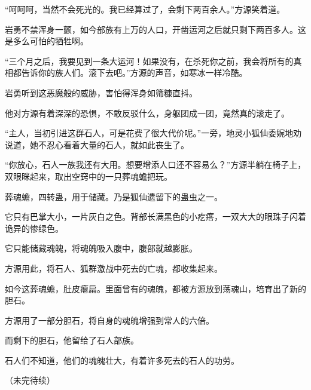 \begin{this_body}
“呵呵呵，当然不会死光的。我已经算过了，会剩下两百余人。”方源笑着道。

岩勇不禁浑身一颤，如今部族有上万的人口，开凿运河之后就只剩下两百多人。这是多么可怕的牺牲啊。

“三个月之后，我要见到一条大运河！如果没有，在杀死你之前，我会将所有的真相都告诉你的族人们。滚下去吧。”方源的声音，如寒冰一样冷酷。

岩勇听到这恶魔般的威胁，害怕得浑身如筛糠直抖。

他对方源有着深深的恐惧，不敢反驳什么，身躯团成一团，竟然真的滚走了。

“主人，当初引进这群石人，可是花费了很大代价呢。”一旁，地灵小狐仙委婉地劝说道，她不忍心看着大量的石人，就如此丧生了。

“你放心，石人一族我还有大用。想要增添人口还不容易么？”方源半躺在椅子上，双眼眯起来，取出空窍中的一只葬魂蟾把玩。

葬魂蟾，四转蛊，用于储藏。乃是狐仙遗留下的蛊虫之一。

它只有巴掌大小，一片灰白之色。背部长满黑色的小疙瘩，一双大大的眼珠子闪着诡异的惨绿色。

它只能储藏魂魄，将魂魄吸入腹中，腹部就越膨胀。

方源用此，将石人、狐群激战中死去的亡魂，都收集起来。

如今这葬魂蟾，肚皮瘪扁。里面曾有的魂魄，都被方源放到荡魂山，培育出了新的胆石。

方源用了一部分胆石，将自身的魂魄增强到常人的六倍。

而剩下的胆石，他留给了石人部族。

石人们不知道，他们的魂魄壮大，有着许多死去的石人的功劳。

（未完待续）

\end{this_body}

